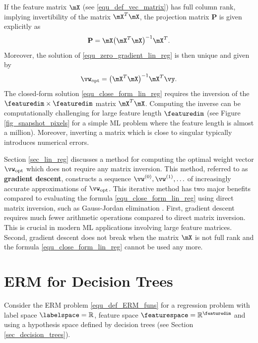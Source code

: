 \documentclass[12pt]{report}
\begin{document}
If the feature matrix $\mX$ (see \eqref{equ_def_vec_matrix}) has full column rank, implying invertibility of the matrix $\mX^{T} \mX$, 
the projection matrix $\mathbf{P}$ is given explicitly as 
\begin{equation} 
\nonumber
\mathbf{P} = \mX \big( \mX^{T} \mX \big)^{-1} \mX^{T}. 
\end{equation} 
Moreover, the solution of \eqref{equ_zero_gradient_lin_reg} is then unique and given by 
\begin{equation}
\label{equ_close_form_lin_reg}
\vw_{\rm opt} = \big(  \mX^{T} \mX \big)^{-1} \mX^{T} \vy. 
\end{equation}
The closed-form solution \eqref{equ_close_form_lin_reg} requires 
the inversion of the $\featuredim \times \featuredim$ matrix $\mX^{T} \mX$. 
Computing the inverse can be computationally challenging for 
large feature length $\featuredim$ (see Figure \ref{fig_snapshot_pixels} 
for a simple ML problem where the feature length is almost a million). 
Moreover, inverting a matrix which is close to singular typically 
introduces numerical errors. 

Section \ref{sec_lin_reg} discusses a method for computing the optimal weight vector 
$\vw_{\rm opt}$ which does not require any matrix inversion. This method, 
referred to as {\bf gradient descent}, constructs a sequence 
$\vw^{(0)}, \vw^{(1)},\ldots$ of increasingly accurate approximations 
of $\vw_{\rm opt}$. This iterative method has two major benefits 
compared to evaluating the formula \eqref{equ_close_form_lin_reg} using 
direct matrix inversion, such as Gauss-Jordan elimination \cite{golub96}. 
First, gradient descent requires much fewer arithmetic operations compared 
to direct matrix inversion. This is crucial in modern ML applications involving 
large feature matrices. Second, gradient descent does not break when the 
matrix $\mX$ is not full rank and the formula \eqref{equ_close_form_lin_reg} 
cannot be used any more. 

\section{ERM for Decision Trees}
\label{sec_ERM_decision_tree}

Consider the ERM problem \eqref{equ_def_ERM_funs} for a regression 
problem with label space $\labelspace=\mathbb{R}$, feature space 
$\featurespace= \mathbb{R}^{\featuredim}$ and using a hypothesis 
space defined by decision trees (see Section \ref{sec_decision_trees}). 
\end{document}
